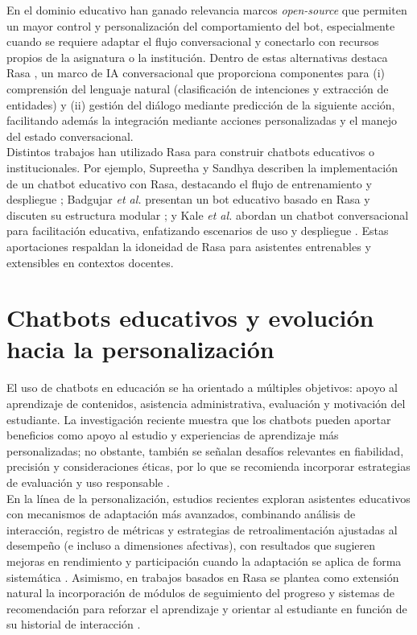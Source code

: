 \documentclass[a4paper,12pt,twoside,final]{book}
\begin{document}
En el dominio educativo han ganado relevancia marcos \textit{open-source} que permiten un mayor control y personalización del comportamiento del bot, especialmente cuando se requiere adaptar el flujo conversacional y conectarlo con recursos propios de la asignatura o la institución. Dentro de estas alternativas destaca Rasa \cite{rasaDocs}, un marco de IA conversacional que proporciona componentes para (i) comprensión del lenguaje natural (clasificación de intenciones y extracción de entidades) y (ii) gestión del diálogo mediante predicción de la siguiente acción, facilitando además la integración mediante acciones personalizadas y el manejo del estado conversacional.\\

Distintos trabajos han utilizado Rasa para construir chatbots educativos o institucionales. Por ejemplo, Supreetha y Sandhya describen la implementación de un chatbot educativo con Rasa, destacando el flujo de entrenamiento y despliegue \cite{Supreetha2022}; Badgujar \textit{et al.} presentan un bot educativo basado en Rasa y discuten su estructura modular \cite{Badgujar2023}; y Kale \textit{et al.} abordan un chatbot conversacional para facilitación educativa, enfatizando escenarios de uso y despliegue \cite{Kale2025}. Estas aportaciones respaldan la idoneidad de Rasa para asistentes entrenables y extensibles en contextos docentes.

\section{Chatbots educativos y evolución hacia la personalización}
\label{sec:personalizacion}

El uso de chatbots en educación se ha orientado a múltiples objetivos: apoyo al aprendizaje de contenidos, asistencia administrativa, evaluación y motivación del estudiante. La investigación reciente muestra que los chatbots pueden aportar beneficios como apoyo al estudio y experiencias de aprendizaje más personalizadas; no obstante, también se señalan desafíos relevantes en fiabilidad, precisión y consideraciones éticas, por lo que se recomienda incorporar estrategias de evaluación y uso responsable \cite{Labadze2023}. \\

En la línea de la personalización, estudios recientes exploran asistentes educativos con mecanismos de adaptación más avanzados, combinando análisis de interacción, registro de métricas y estrategias de retroalimentación ajustadas al desempeño (e incluso a dimensiones afectivas), con resultados que sugieren mejoras en rendimiento y participación cuando la adaptación se aplica de forma sistemática \cite{Gutierrez2025}. Asimismo, en trabajos basados en Rasa se plantea como extensión natural la incorporación de módulos de seguimiento del progreso y sistemas de recomendación para reforzar el aprendizaje y orientar al estudiante en función de su historial de interacción \cite{Supreetha2022}.
\end{document}
